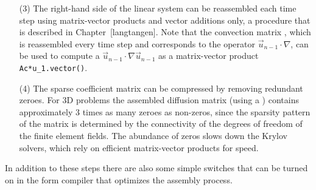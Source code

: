 \begin{itemize}
\item[(3)] The right-hand side of the linear system
can be reassembled each time step using matrix-vector products and
vector additions only, a procedure that is described in
Chapter~[langtangen]. Note that the convection matrix ,
which is reassembled every time step and corresponds to the
operator $\vec{u}_{n-1}\cdot\nabla$, can be used to compute a
$\vec{u}_{n-1}\cdot\nabla\vec{u}_{n-1}$ as a matrix-vector
product {\fontsize{12pt}{12pt}\verb!Ac*u_1.vector()!}.

\item[(4)] The sparse coefficient matrix can be compressed by removing
redundant zeroes. For 3D problems the
assembled diffusion matrix (using a ) 
contains approximately 3 times as many zeroes as non-zeros, since
the sparsity pattern of the matrix is determined by the connectivity of
the degrees of freedom of the finite element fields. The
abundance of zeros slows down the Krylov solvers, which rely on
efficient matrix-vector products for speed.

\end{itemize}
In addition to these steps there are also some simple switches that
can be turned on in the form compiler that optimizes the assembly
process. 

